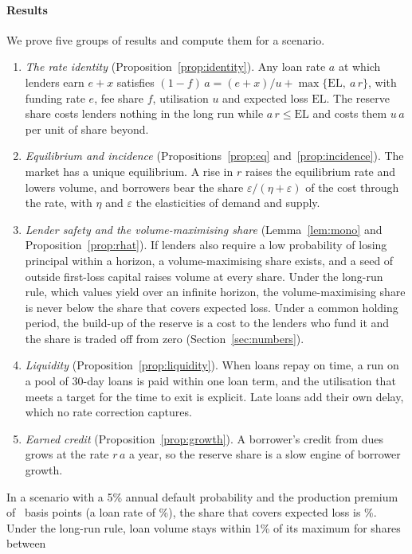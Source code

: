 \documentclass[preprint,11pt,authoryear]{elsarticle}
\theoremstyle{definition}
\newcommand{\EL}{\mathrm{EL}}
\begin{document}
\paragraph{Results} We prove five groups of results and compute them for a scenario.
\begin{enumerate}
\item \emph{The rate identity} (Proposition~\ref{prop:identity}). Any loan rate $a$ at which lenders
  earn $e+x$ satisfies $(1-f)\,a = (e+x)/u + \max\{\EL,\ a\,r\}$, with funding rate $e$, fee share
  $f$, utilisation $u$ and expected loss $\EL$. The reserve share costs lenders nothing in the long
  run while $a\,r\le\EL$ and costs them $u\,a$ per unit of share beyond.
\item \emph{Equilibrium and incidence} (Propositions~\ref{prop:eq} and~\ref{prop:incidence}). The
  market has a unique equilibrium. A rise in $r$ raises the equilibrium rate and lowers volume, and
  borrowers bear the share $\varepsilon/(\eta+\varepsilon)$ of the cost through the rate, with $\eta$
  and $\varepsilon$ the elasticities of demand and supply.
\item \emph{Lender safety and the volume-maximising share} (Lemma~\ref{lem:mono} and
  Proposition~\ref{prop:rhat}). If lenders also require a low probability of losing principal
  within a horizon, a volume-maximising share exists, and a seed of outside first-loss capital
  raises volume at every share. Under the long-run rule, which values yield over an infinite horizon,
  the volume-maximising share is never below the share that covers expected loss. Under a common
  holding period, the build-up of the reserve is a cost to the lenders who fund it and the share
  is traded off from zero (Section~\ref{sec:numbers}).
\item \emph{Liquidity} (Proposition~\ref{prop:liquidity}). When loans repay on time, a run on a pool
  of 30-day loans is paid within one loan term, and the utilisation that meets a target for the time
  to exit is explicit. Late loans add their own delay, which no rate correction captures.
\item \emph{Earned credit} (Proposition~\ref{prop:growth}). A borrower's credit from dues grows at
  the rate $r\,a$ a year, so the reserve share is a slow engine of borrower growth.
\end{enumerate}
In a scenario with a 5\% annual default probability and the production premium of
\PremBps\ basis points (a loan rate of \ARef\%), the share that covers expected loss is \RC\%.
Under the long-run rule, loan volume stays within 1\% of its maximum for shares between
\end{document}
